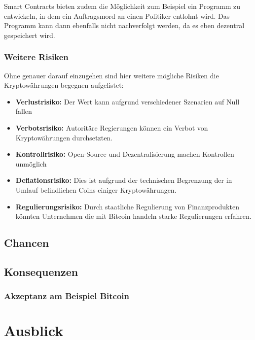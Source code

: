 \documentclass[12pt,oneside]{article}
\begin{document}
Smart Contracts bieten zudem die Möglichkeit zum Beispiel ein Programm zu entwickeln, in dem ein Auftragsmord an einen Politiker entlohnt wird. Das Programm kann dann ebenfalls nicht nachverfolgt werden, da es eben dezentral gespeichert wird.  

\subsubsection{Weitere Risiken}
Ohne genauer darauf einzugehen sind hier weitere mögliche Risiken die Kryptowährungen begegnen aufgelistet: 

\begin{itemize}
  \item \textbf{Verlustrisiko:} Der Wert kann aufgrund verschiedener Szenarien auf Null fallen
  \item \textbf{Verbotsrisiko:} Autoritäre Regierungen können ein Verbot von Kryptowährungen durchsetzten.
  \item \textbf{Kontrollrisiko:} Open-Source und Dezentralisierung machen Kontrollen unmöglich
  \item \textbf{Deflationsrisiko:} Dies ist aufgrund der technischen Begrenzung der in Umlauf befindlichen Coins einiger Kryptowährungen. 
  \item \textbf{Regulierungsrisiko:} Durch staatliche Regulierung von Finanzprodukten könnten Unternehmen die mit Bitcoin handeln starke Regulierungen erfahren.
\end{itemize}\citep{neumann2017}

\subsection{Chancen}

\subsection{Konsequenzen}

\subsubsection{Akzeptanz am Beispiel Bitcoin}

\section{Ausblick}
\clearpage
\lhead{}
\printbibliography
{}



\end{document}
